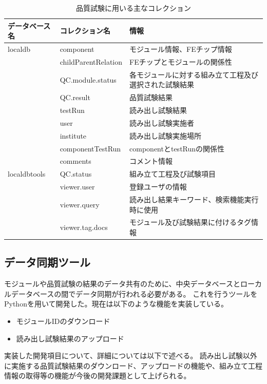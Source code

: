 \begin{table}[tbp]
\begin{center}
\caption[品質試験に用いる主なコレクション]{品質試験に用いる主なコレクション}
\label{localdb_structure}
  \begin{tabular}{|lll|} \hline
    データベース名 & コレクション名 & 情報 \\ \hline
    localdb      & component & モジュール情報、FEチップ情報 \\ 
                 & childParentRelation & FEチップとモジュールの関係性 \\ 
                 & QC.module.status & 各モジュールに対する組み立て工程及び選択された試験結果 \\ 
                 & QC.result & 品質試験結果 \\ 
                 & testRun & 読み出し試験結果 \\ 
                 & user & 読み出し試験実施者 \\
                 & institute & 読み出し試験実施場所 \\
                 & componentTestRun & componentとtestRunの関係性 \\
                 & comments & コメント情報 \\ \hline
    localdbtools & QC.status & 組み立て工程及び試験項目\\
                 & viewer.user & 登録ユーザの情報 \\
                 & viewer.query & 読み出し結果キーワード、検索機能実行時に使用 \\ 
                 & viewer.tag.docs & モジュール及び試験結果に付けるタグ情報 \\ \hline
  \end{tabular}
\end{center}
\end{table}

\subsection{データ同期ツール}
モジュールや品質試験の結果のデータ共有のために、中央データベースとローカルデータベースの間でデータ同期が行われる必要がある。
これを行うツールをPythonを用いて開発した。現在は以下のような機能を実装している。
\begin{itemize}
  \item モジュールIDのダウンロード
  \item 読み出し試験結果のアップロード
\end{itemize}
実装した開発項目について、詳細については以下で述べる。
読み出し試験以外に実施する品質試験結果のダウンロード、アップロードの機能や、組み立て工程情報の取得等の機能が今後の開発課題として上げられる。

